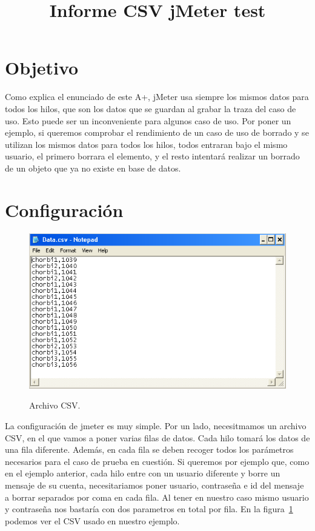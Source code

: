 \documentclass[a4paper]{article}
\title{Informe CSV jMeter test}
\date{}
\begin{document}
\setlength{\voffset}{-1in}
\setlength{\textheight}{680px}
\setlength{\headsep}{30px}
\maketitle

\section{Objetivo}

Como explica el enunciado de este A+, jMeter usa siempre los mismos datos para todos los hilos, que son los datos que se guardan al grabar la traza del caso de uso. Esto puede ser un inconveniente para algunos caso de uso. Por poner un ejemplo, si queremos comprobar el rendimiento de un caso de uso de borrado y se utilizan los mismos datos para todos los hilos, todos entraran bajo el mismo usuario, el primero borrara el elemento, y el resto intentará realizar un borrado de un objeto que ya no existe en base de datos.

\section{Configuración}

\begin{figure}
\caption{Archivo CSV.}
\includegraphics[width=\linewidth]{Data}
\label{fig:Data}
\end{figure}

La configuración de jmeter es muy simple. Por un lado, necesitmamos un archivo CSV, en el que vamos a poner varias filas de datos. Cada hilo tomará los datos de una fila diferente. Además, en cada fila se deben recoger todos los parámetros necesarios para el caso de prueba en cuestión. Si queremos por ejemplo que, como en el ejemplo anterior, cada hilo entre con un usuario diferente y borre un mensaje de su cuenta, necesitariamos poner usuario, contraseña e id del mensaje a borrar separados por coma en cada fila. Al tener en nuestro caso mismo usuario y contraseña nos bastaría con dos parametros en total por fila. En la figura~\ref{fig:Data} podemos ver el CSV usado en nuestro ejemplo.
\end{document}
